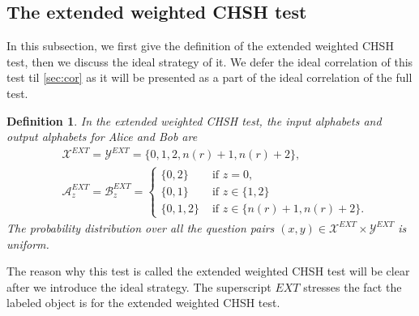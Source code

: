 \documentclass[11pt,letterpaper]{article}
\newcommand{\calX}{\mathcal{X}}
\newcommand{\calY}{\mathcal{Y}}
\newcommand{\calA}{\mathcal{A}}
\newcommand{\calB}{\mathcal{B}}
\newcommand{\1}{\mathbb{1}}
\newcommand{\EXT}{EXT}
\newcommand{\nr}{n(r)}
\newtheorem{definition}[theorem]{Definition}
\theoremstyle{definition}
\begin{document}
\subsection{The extended weighted CHSH test}
\label{sec:ext_w_chsh}
In this subsection, we first give the definition of the 
extended weighted CHSH test, then we discuss the ideal strategy of it.
We defer the ideal correlation of this test til \cref{sec:cor}
as it will be presented as a part of the ideal correlation of the full test.
\begin{definition}
    \label{def:ext_w_chsh}
    In the extended weighted CHSH test, the input alphabets and output alphabets for Alice and Bob are
    \begin{align*}
        &\calX^{\EXT} = \calY^{\EXT} = \{0, 1, 2, \nr+1, \nr+2\}, \\
        &\calA_z^{\EXT} = \calB_z^{\EXT} =
        \begin{cases}
            \{0,2\} &\text{ if } z = 0, \\
            \{0,1\} &\text{ if } z \in \{1, 2\} \\
            \{0,1,2\} &\text{ if } z \in \{\nr+1, \nr+2\}. 
        \end{cases}
    \end{align*}
    The probability distribution over all the question pairs 
    $(x,y) \in \calX^{\EXT} \times \calY^{\EXT}$ is uniform.
\end{definition}
The reason why this test is called the extended weighted CHSH test will be clear 
after we introduce the ideal strategy.
The superscript $\EXT$ stresses the fact 
the labeled object is for the extended weighted CHSH test.
\end{document}
